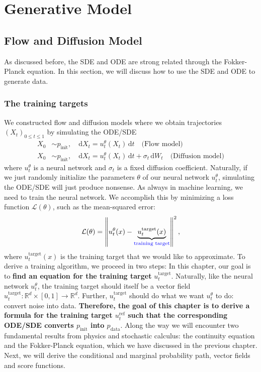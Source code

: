 \chapter{Generative Model}\label{cap2}

\section{Flow and Diffusion Model}
As discussed before, the SDE and ODE are strong related through the Fokker-Planck equation. In this section, we will discuss how to use the SDE and ODE to generate data. \cite{flowsanddiffusions2025}
\subsection{The training targets}
We constructed flow and diffusion models where we obtain trajectories $(X_t)_{0 \leq t \leq 1}$ by simulating the ODE/SDE
\begin{align}
    X_0 &\sim p_{\text{init}}, \quad \mathrm{d}X_t = u_t^\theta(X_t)\, \mathrm{d}t \tag{10} \quad \text{(Flow model)} \\
    X_0 &\sim p_{\text{init}}, \quad \mathrm{d}X_t = u_t^\theta(X_t)\, \mathrm{d}t + \sigma_t \, \mathrm{d}W_t \tag{11} \quad \text{(Diffusion model)}
\end{align}
where $u_t^\theta$ is a neural network and $\sigma_t$ is a fixed diffusion coefficient. Naturally, if we just randomly initialize the parameters $\theta$ of our neural network $u_t^\theta$, simulating the ODE/SDE will just produce nonsense. As always in machine learning, we need to train the neural network. We accomplish this by minimizing a loss function $\mathcal{L}(\theta)$, such as the mean-squared error:
\[
\mathcal{L}(\theta) = \left\| u_t^\theta(x) - 
\underbrace{u_t^{\text{target}}(x)}_{\text{\textcolor{blue}{training target}}} 
\right\|^2,
\]
where $u_t^{\text{target}}(x)$ is the training target that we would like to approximate. To derive a training algorithm, we proceed in two steps: In this chapter, our goal is to \textbf{find an equation for the training target} $u_t^{\text{target}}$. Naturally, like the neural network $u_t^\theta$, the training target should itself be a vector field $u_t^{\text{target}} : \mathbb{R}^d \times [0,1] \to \mathbb{R}^d$. Further, $u_t^{\text{target}}$ should do what we want $u_t^\theta$ to do: convert noise into data. \textbf{Therefore, the goal of this chapter is to derive a formula for the training target $u_t^{\text{ref}}$ such that the corresponding ODE/SDE converts $p_{\text{init}}$ into $p_{\text{data}}$}. Along the way we will encounter two fundamental results from physics and stochastic calculus: the continuity equation and the Fokker-Planck equation, which we have discussed in the previous chapter. Next, we will derive the conditional and marginal probability path, vector fields and score functions.

